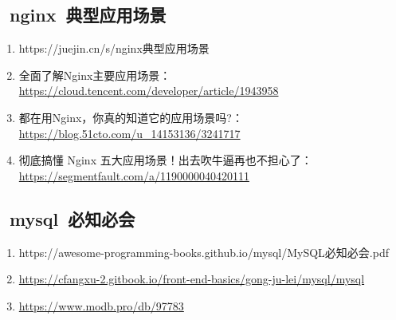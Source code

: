 \documentclass[12pt, a4paper]{article} %
\begin{document}
\begin{CJK*}{UTF8}{gbsn}
\subsection{~nginx~典型应用场景}
\begin{enumerate}
    \item https://juejin.cn/s/nginx典型应用场景
    \item 全面了解Nginx主要应用场景：\url{https://cloud.tencent.com/developer/article/1943958}
    \item 都在用Nginx，你真的知道它的应用场景吗?：\url{https://blog.51cto.com/u_14153136/3241717}
    \item 彻底搞懂 Nginx 五大应用场景！出去吹牛逼再也不担心了：\url{https://segmentfault.com/a/1190000040420111}
\end{enumerate}

\subsection{~mysql~必知必会}
\begin{enumerate}
    \item https://awesome-programming-books.github.io/mysql/MySQL必知必会.pdf
    \item \url{https://cfangxu-2.gitbook.io/front-end-basics/gong-ju-lei/mysql/mysql}
    \item \url{https://www.modb.pro/db/97783}
\end{enumerate}


\end{CJK*}
\end{document}
